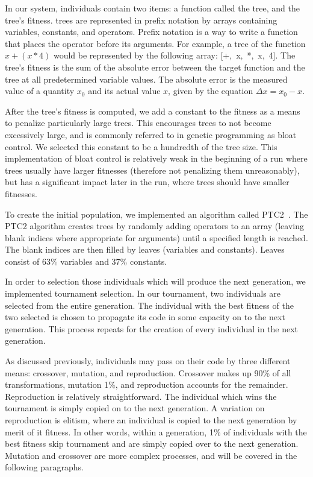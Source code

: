 \documentclass[12pt]{article}
\begin{document}
In our system, individuals contain two items: a function called the tree, and the tree's fitness. trees are represented in prefix notation by arrays containing variables, constants, and operators. Prefix notation is a way to write  a function that places the operator before its arguments. For example, a tree of the function $x + (x * 4)$ would be represented by the following array: [+,~x,~*,~x,~4]. The tree's fitness is the sum of the absolute error between the target function and the tree at all predetermined variable values. The absolute error is  the measured value of a quantity $x_{0}$ and its actual value $x$, given by the equation $\Delta x=x_{0}-x$. 

After the tree's fitness is computed, we add a constant to the fitness as a means to penalize particularly large trees. This encourages trees to not become excessively large, and is commonly referred to in genetic programming as bloat control. We selected this constant to be a hundredth of the tree size. This implementation of bloat control is relatively weak in the beginning of a run where trees usually have larger fitnesses (therefore not penalizing them unreasonably), but has a significant impact later in the run, where trees should have smaller fitnesses.

To create the initial population, we implemented an algorithm called PTC2~\cite{Luke2013Metaheuristics}. The PTC2 algorithm creates trees by randomly adding operators to an array (leaving blank indices where appropriate for arguments) until a specified length is reached. The blank indices are then filled by leaves (variables and constants). Leaves consist of 63\% variables and 37\% constants.

In order to selection those individuals which will produce the next generation, we  implemented tournament selection. In our tournament, two individuals are selected from the entire generation. The individual with the best fitness of the two selected is chosen to propagate its code in some capacity on to the next generation. This process repeats for the creation of every individual in the next generation.

As discussed previously, individuals may pass on their code by three different means: crossover, mutation, and reproduction. Crossover makes up 90\% of all transformations, mutation 1\%, and reproduction accounts for the remainder. Reproduction is relatively straightforward. The individual which wins the tournament is simply copied on to the next generation. A variation on reproduction is elitism, where an individual is copied to the next generation by merit of it fitness. In other words, within a generation, 1\% of individuals with the best fitness skip tournament and are simply copied over to the next generation. Mutation and crossover are more complex processes, and will be covered in the following paragraphs.
\end{document}
